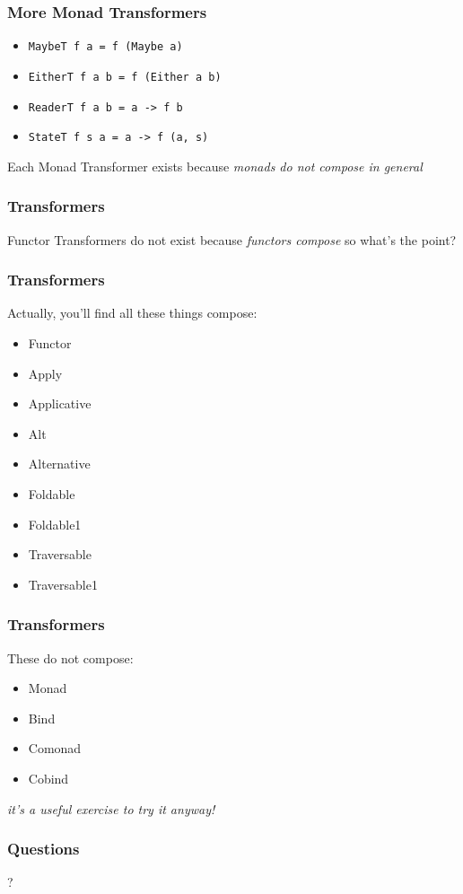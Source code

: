 \begin{frame}[fragile]
\frametitle{More Monad Transformers}
\begin{itemize}
  \item \lstinline $MaybeT f a = f (Maybe a)$
  \item \lstinline $EitherT f a b = f (Either a b)$
  \item \lstinline $ReaderT f a b = a -> f b$
  \item \lstinline $StateT f s a = a -> f (a, s)$
\end{itemize}
\begin{block}{Each Monad Transformer exists}
because \emph{monads do not compose in general}
\end{block}
\end{frame}

\begin{frame}[fragile]
\frametitle{Transformers}
\begin{block}{Functor Transformers do not exist}
because \emph{functors compose} so what's the point?
\end{block}
\end{frame}

\begin{frame}[fragile]
\frametitle{Transformers}
\begin{block}{Actually, you'll find all these things compose:}
\begin{itemize}
\item Functor
\item Apply
\item Applicative
\item Alt
\item Alternative
\item Foldable
\item Foldable1
\item Traversable
\item Traversable1
\end{itemize}
\end{block}
\end{frame}

\begin{frame}[fragile]
\frametitle{Transformers}
\begin{block}{These do not compose:}
\begin{itemize}
\item Monad
\item Bind
\item Comonad
\item Cobind
\end{itemize}
\emph{it's a useful exercise to try it anyway!}
\end{block}
\end{frame}

\begin{frame}[fragile]
\frametitle{Questions}
?
\end{frame}
